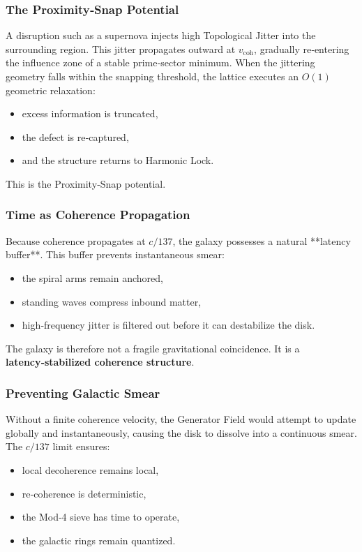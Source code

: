 \documentclass[reprint,amsmath,amssymb,aps,prl,floatfix]{revtex4-2}
\begin{document}
\begin{itemize}
\subsubsection{The Proximity‑Snap Potential}

A disruption such as a supernova injects high Topological Jitter into the surrounding region. This jitter propagates outward at \(v_{\text{coh}}\), gradually re‑entering the influence zone of a stable prime‑sector minimum. When the jittering geometry falls within the snapping threshold, the lattice executes an \(O(1)\) geometric relaxation:
\begin{itemize}
\item excess information is truncated,  
\item the defect is re‑captured,  
\item and the structure returns to Harmonic Lock.
\end{itemize}

This is the Proximity‑Snap potential.

\subsubsection{Time as Coherence Propagation}

Because coherence propagates at \(c/137\), the galaxy possesses a natural **latency buffer**. This buffer prevents instantaneous smear:
\begin{itemize}
\item the spiral arms remain anchored,  
\item standing waves compress inbound matter,  
\item high‑frequency jitter is filtered out before it can destabilize the disk.
\end{itemize}

The galaxy is therefore not a fragile gravitational coincidence.  
It is a \textbf{latency‑stabilized coherence structure}.

\subsubsection{Preventing Galactic Smear}

Without a finite coherence velocity, the Generator Field would attempt to update globally and instantaneously, causing the disk to dissolve into a continuous smear. The \(c/137\) limit ensures:
\begin{itemize}
\item local decoherence remains local,  
\item re‑coherence is deterministic,  
\item the Mod‑4 sieve has time to operate,  
\item the galactic rings remain quantized.
\end{itemize}


\end{itemize}
\end{document}
